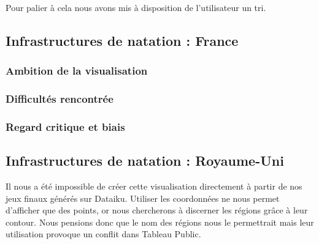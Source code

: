 \documentclass[hidelinks, 12pt]{report}
\begin{document}
Pour palier à cela nous avons mis à disposition de l’utilisateur un tri.








































\subsection{Infrastructures de natation : France}



\subsubsection{Ambition de la visualisation}


\subsubsection{Difficultés rencontrée}


\subsubsection{Regard critique et biais}


\subsection{Infrastructures de natation : Royaume-Uni}

Il nous a été impossible de créer cette visualisation directement à partir de nos jeux finaux générés sur Dataiku. Utiliser les coordonnées ne nous permet d'afficher que des points, or nous chercherons à discerner les régions grâce à leur contour. Nous pensions donc que le nom des régions nous le permettrait mais leur utilisation provoque un conflit dans Tableau Public.
\end{document}
